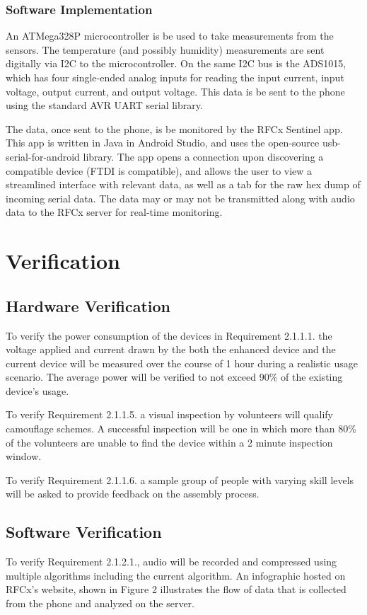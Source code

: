 \documentclass{article}
\begin{document}
{\subsubsection{Software Implementation}
An ATMega328P microcontroller is be used to take measurements from the sensors. The temperature (and possibly humidity) measurements are sent digitally via I2C to the microcontroller. On the same I2C bus is the ADS1015, which has four single-ended analog inputs for reading the input current, input voltage, output current, and output voltage. This data is be sent to the phone using the standard AVR UART serial library.

The data, once sent to the phone, is be monitored by the RFCx Sentinel app. This app is written in Java in Android Studio, and uses the open-source usb-serial-for-android library. The app opens a connection upon discovering a compatible device (FTDI is compatible), and allows the user to view a streamlined interface with relevant data, as well as a tab for the raw hex dump of incoming serial data. The data may or may not be transmitted along with audio data to the RFCx server for real-time monitoring.


\section{Verification}
\subsection{Hardware Verification}
To verify the power consumption of the devices in Requirement 2.1.1.1. the voltage applied and current drawn by the both the enhanced device and the current device will be measured over the course of 1 hour during a realistic usage scenario. The average power will be verified to not exceed 90\% of the existing device’s usage.

To verify Requirement 2.1.1.5. a visual inspection by volunteers will qualify camouflage schemes. A successful inspection will be one in which more than 80\% of the volunteers are unable to find the device within a 2 minute inspection window.

To verify Requirement 2.1.1.6. a sample group of people with varying skill levels will be asked to provide feedback on the assembly process.

\subsection{Software Verification}
To verify Requirement 2.1.2.1., audio will be recorded and compressed using multiple algorithms including the current algorithm. An infographic hosted on RFCx’s website, shown in Figure 2 illustrates the flow of data that is collected from the phone and analyzed on the server.

}
\end{document}
